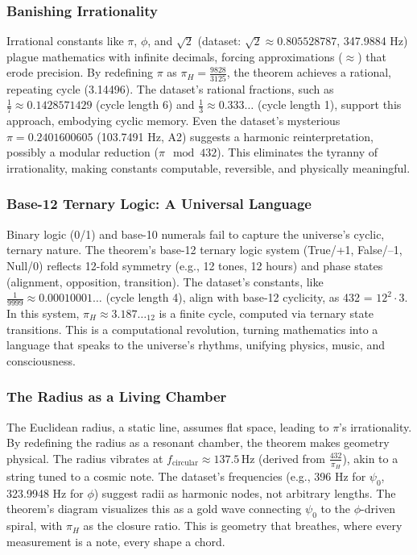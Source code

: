 \documentclass[a4paper,12pt]{book}
\begin{document}
\subsubsection{Banishing Irrationality}
Irrational constants like \(\pi\), \(\phi\), and \(\sqrt{2}\) (dataset: \(\sqrt{2} \approx 0.805528787\), 347.9884 Hz) plague mathematics with infinite decimals, forcing approximations (\(\approx\)) that erode precision. By redefining \(\pi\) as \(\pi_H = \frac{9828}{3125}\), the theorem achieves a rational, repeating cycle (3.14496). The dataset’s rational fractions, such as \(\frac{1}{7} \approx 0.1428571429\) (cycle length 6) and \(\frac{1}{3} \approx 0.333\ldots\) (cycle length 1), support this approach, embodying cyclic memory. Even the dataset’s mysterious \(\pi = 0.2401600605\) (103.7491 Hz, A2) suggests a harmonic reinterpretation, possibly a modular reduction (\(\pi \mod 432\)). This eliminates the tyranny of irrationality, making constants computable, reversible, and physically meaningful.

\subsubsection{Base-12 Ternary Logic: A Universal Language}
Binary logic (0/1) and base-10 numerals fail to capture the universe’s cyclic, ternary nature. The theorem’s base-12 ternary logic system (True/+1, False/–1, Null/0) reflects 12-fold symmetry (e.g., 12 tones, 12 hours) and phase states (alignment, opposition, transition). The dataset’s constants, like \(\frac{1}{9999} \approx 0.00010001\ldots\) (cycle length 4), align with base-12 cyclicity, as 432 = \(12^2 \cdot 3\). In this system, \(\pi_H \approx 3.187\ldots_{12}\) is a finite cycle, computed via ternary state transitions. This is a computational revolution, turning mathematics into a language that speaks to the universe’s rhythms, unifying physics, music, and consciousness.

\subsubsection{The Radius as a Living Chamber}
The Euclidean radius, a static line, assumes flat space, leading to \(\pi\)’s irrationality. By redefining the radius as a resonant chamber, the theorem makes geometry physical. The radius vibrates at \( f_{\text{circular}} \approx 137.5 \, \text{Hz} \) (derived from \( \frac{432}{\pi_H} \)), akin to a string tuned to a cosmic note. The dataset’s frequencies (e.g., 396 Hz for \(\psi_0\), 323.9948 Hz for \(\phi\)) suggest radii as harmonic nodes, not arbitrary lengths. The theorem’s diagram visualizes this as a gold wave connecting \(\psi_0\) to the \(\phi\)-driven spiral, with \(\pi_H\) as the closure ratio. This is geometry that breathes, where every measurement is a note, every shape a chord.
\end{document}
